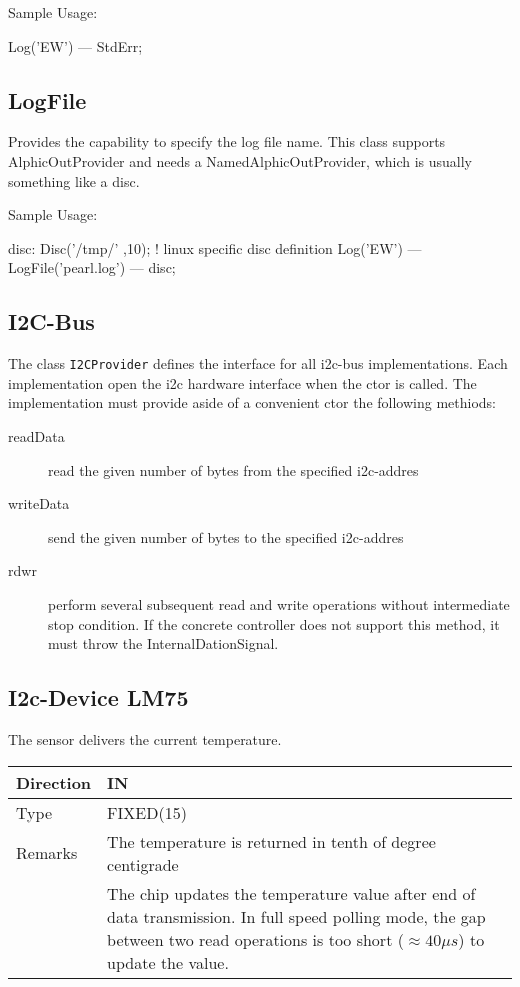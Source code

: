 Sample Usage:
\begin{PEARLCode}
Log('EW') --- StdErr;
\end{PEARLCode}


\subsection{LogFile}
Provides the capability to specify the log file name. This class
supports AlphicOutProvider and needs a NamedAlphicOutProvider,
which is usually something like a disc.

Sample Usage:
\begin{PEARLCode}
disc: Disc('/tmp/' ,10); ! linux specific disc definition
Log('EW') --- LogFile('pearl.log') --- disc;
\end{PEARLCode}

\subsection{I2C-Bus}
The class \texttt{I2CProvider} defines the interface for all i2c-bus 
implementations. Each implementation open the i2c hardware interface 
when the ctor is called. The implementation must provide aside of a
convenient ctor the following methiods:

\begin{description}
\item[readData] read the given number of bytes from the specified 
   i2c-addres
\item[writeData] send the given number of bytes to the specified
    i2c-addres
\item[rdwr] perform several subsequent read and write operations 
   without intermediate stop condition. If the concrete controller
   does not support this method, it must throw the InternalDationSignal.
\end{description}

\subsection{I2c-Device LM75}
The sensor delivers the current temperature.

\begin{tabular}{|l|p{10cm}|}
\hline
Direction & IN \\
\hline
Type & FIXED(15) \\
\hline
Remarks& The temperature is returned in tenth of degree centigrade\\
& The chip updates the temperature value after end of data transmission. 
  In full speed polling mode, the gap between two read operations is too 
  short ($\approx 40 \mu s$) to update the value.\\
\hline
\end{tabular}

